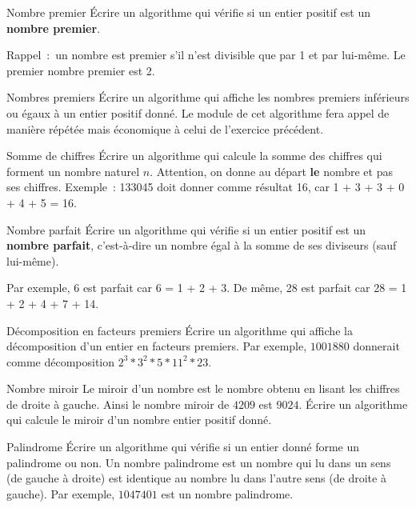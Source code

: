 	\begin{Exercice}{Nombre premier}
		Écrire un algorithme qui vérifie si un entier positif est un
		\textbf{nombre premier}. 
		
		Rappel~:~un nombre est premier s’il n’est divisible que par 1 et par
		lui-même. Le premier nombre premier est 2.
	\end{Exercice}
	
	\begin{Exercice}{Nombres premiers}
		Écrire un algorithme qui affiche les nombres premiers inférieurs ou
		égaux à un entier positif donné. Le module de cet algorithme fera appel
		de manière répétée mais économique à celui de l’exercice précédent.
	\end{Exercice}

	\begin{Exercice}{Somme de chiffres}
		Écrire un algorithme qui calcule la somme des chiffres qui forment un
		nombre naturel $n$. Attention, on donne au départ \textbf{le} nombre et
		pas ses chiffres. Exemple~: 133045 doit donner comme résultat 16,
		car 1 + 3 + 3 + 0 + 4 + 5 = 16.
	\end{Exercice}
	
	\begin{Exercice}{Nombre parfait}
		Écrire un algorithme qui vérifie si un entier positif est un
		\textbf{nombre parfait}, c’est-à-dire un nombre égal à la somme de ses
		diviseurs (sauf lui-même). 
		
		Par exemple, 6 est parfait car 6 = 1 + 2 + 3. 
		De même, 28 est parfait car 28 = 1 + 2 + 4 + 7 + 14.
	\end{Exercice}
	
	\begin{Exercice}{Décomposition en facteurs premiers}
		Écrire un algorithme qui affiche la décomposition 
		d’un entier en facteurs premiers. 
		Par exemple, $1001880$ donnerait comme décomposition
		$2^3 * 3^2 * 5 * 11^2 * 23$.
	\end{Exercice}

	\begin{Exercice}{Nombre miroir}
		Le miroir d’un nombre est le nombre obtenu
		en lisant les chiffres de droite à gauche.
		Ainsi le nombre miroir de $4209$ est $9024$.
		Écrire un algorithme qui calcule le miroir
		d’un nombre entier positif donné.
	\end{Exercice}
	
	\begin{Exercice}{Palindrome}
		Écrire un algorithme qui vérifie si un entier donné 
		forme un palindrome ou non. 
		Un nombre palindrome est un nombre qui lu dans un sens 
		(de gauche à droite) est identique au nombre lu dans l’autre sens 
		(de droite à gauche). 
		Par exemple, $1047401$ est un nombre palindrome.
	\end{Exercice}
	
